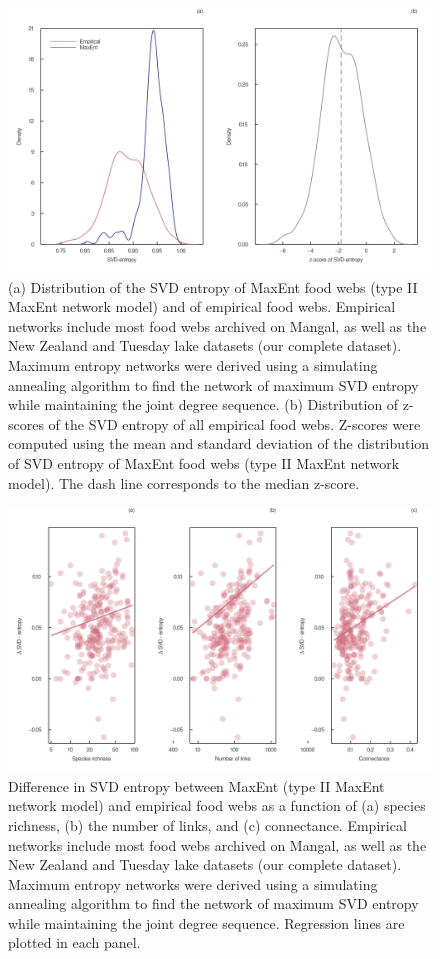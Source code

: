 \documentclass[
  12pt,
]{article}
\begin{document}
\begin{figure}
\hypertarget{fig:entropy_dist}{%
\centering
\includegraphics{figures/entropy_distribution.png}
\caption{(a) Distribution of the SVD entropy of MaxEnt food webs (type
II MaxEnt network model) and of empirical food webs. Empirical networks
include most food webs archived on Mangal, as well as the New Zealand
and Tuesday lake datasets (our complete dataset). Maximum entropy
networks were derived using a simulating annealing algorithm to find the
network of maximum SVD entropy while maintaining the joint degree
sequence. (b) Distribution of z-scores of the SVD entropy of all
empirical food webs. Z-scores were computed using the mean and standard
deviation of the distribution of SVD entropy of MaxEnt food webs (type
II MaxEnt network model). The dash line corresponds to the median
z-score.}\label{fig:entropy_dist}
}
\end{figure}

\begin{figure}
\hypertarget{fig:entropy_size}{%
\centering
\includegraphics{figures/difference_entropy.png}
\caption{Difference in SVD entropy between MaxEnt (type II MaxEnt
network model) and empirical food webs as a function of (a) species
richness, (b) the number of links, and (c) connectance. Empirical
networks include most food webs archived on Mangal, as well as the New
Zealand and Tuesday lake datasets (our complete dataset). Maximum
entropy networks were derived using a simulating annealing algorithm to
find the network of maximum SVD entropy while maintaining the joint
degree sequence. Regression lines are plotted in each
panel.}\label{fig:entropy_size}
}
\end{figure}
\end{document}
